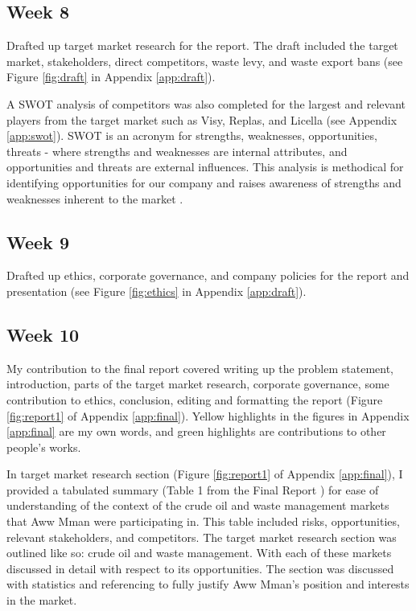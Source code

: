 \documentclass[11pt, a4, nocenter, margin=150mm]{article}
\begin{document}
	\subsection{Week 8}

	Drafted up target market research for the report. The draft included the target market, stakeholders, direct competitors, waste levy, and waste export bans (see Figure \ref{fig:draft} in Appendix \ref{app:draft}).

	A SWOT analysis of competitors was also completed for the largest and relevant players from the target market such as Visy, Replas, and Licella (see Appendix \ref{app:swot}). SWOT is an acronym for strengths, weaknesses, opportunities, threats - where strengths and weaknesses are internal attributes, and opportunities and threats are external influences. This analysis is methodical for identifying opportunities for our company and raises awareness of strengths and weaknesses inherent to the market \cite{swot}.

	\subsection{Week 9}

	Drafted up ethics, corporate governance, and company policies for the report and presentation (see Figure \ref{fig:ethics} in Appendix \ref{app:draft}).

	\subsection{Week 10}

	My contribution to the final report covered writing up the problem statement, introduction, parts of the target market research, corporate governance, some contribution to ethics, conclusion, editing and formatting the report (Figure \ref{fig:report1} of Appendix \ref{app:final}). Yellow highlights in the figures in Appendix \ref{app:final} are my own words, and green highlights are contributions to other people's works.

	In target market research section (Figure \ref{fig:report1} of Appendix \ref{app:final}), I provided a tabulated summary (Table 1 from the Final Report \cite{report}) for ease of understanding of the context of the crude oil and waste management markets that Aww Mman were participating in. This table included risks, opportunities, relevant stakeholders, and competitors. The target market research section was outlined like so: crude oil and waste management. With each of these markets discussed in detail with respect to its opportunities. The section was discussed with statistics and referencing to fully justify Aww Mman's position and interests in the market.
\end{document}
